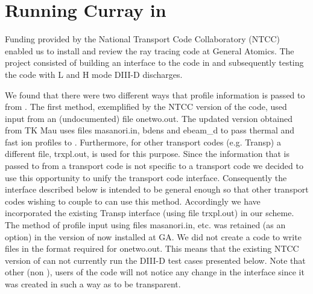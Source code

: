 \renewcommand{\textfraction}{0.10}
\renewcommand{\topfraction}{0.90}  %
\renewcommand{\bottomfraction}{0.65} %
\renewcommand{\floatpagefraction}{0.60}

\section{Running Curray in \ot}

 Funding provided by the National Transport Code Collaboratory 
(NTCC) enabled us to install and review the ray tracing code \ct
at General Atomics. The project consisted of building an interface to
the \ct code in \ot and subsequently testing the \ct code with L and H
mode DIII-D discharges. 

  We found that there were  two  different ways
that profile information is passed to \ct from \ot. The first method,
exemplified by the NTCC version of the code, used input from an
(undocumented) file onetwo.out.  The updated version \ct obtained
from TK Mau uses files  masanori.in, bdens and ebeam\_d to pass thermal
and fast ion profiles to \ct. Furthermore, for other transport codes (e.g.
Transp) a different file, trxpl.out, is used for this purpose.
Since the information that is passed to \ct from a transport code is
not specific to a transport code we decided to use this opportunity
to unify the transport code interface. Consequently  the interface
described below is intended to be general enough so that other transport
codes wishing to couple to \ct can use this method. Accordingly we
have incorporated the existing Transp interface (using file trxpl.out)
in our scheme. The  method of profile input using files
masanori.in, etc.  was retained (as an option) in the version of
\ct now installed at GA. We did not create a code to write files
in the format required for onetwo.out. This means that the existing
NTCC version of \ct can not currently run the DIII-D test cases
presented below. 
Note that other (non \ot), users  of the code will  not notice any change in
the interface  since it was created in such a way as to be 
transparent. 

